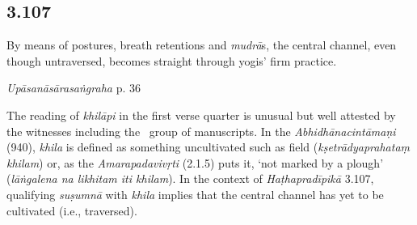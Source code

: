 \begin{ekdosis}


\subsection*{3.107}
\begin{translation}[hp03_107]
By means of postures, breath retentions and \emph{mudrā}s, the central channel, even though untraversed, becomes straight through yogis' firm practice.
\end{translation}
%


\begin{testimonia}[hp03_107]
\emph{Upāsanāsārasaṅgraha} p. 36 %
\begin{versinnote}
\end{versinnote}
\end{testimonia}

\begin{philcomm}[hp03_107]
The reading of \emph{khilāpi} in the first verse quarter is unusual but well attested by the witnesses including the \textalpha\ group of manuscripts. In the \emph{Abhidhāna\-cintāmaṇi} (940), \emph{khila} is defined as something uncultivated such as field (\emph{kṣetrādyaprahataṃ khilam}) or, as the \emph{Amarapadavivṛti} (2.1.5) puts it, `not marked by a plough' (\emph{lāṅgalena na likhitam iti khilam}). In the context of \emph{Haṭhapradīpikā} 3.107, qualifying \emph{suṣumnā} with \emph{khila} implies that the central channel has yet to be cultivated (i.e., traversed).



\end{philcomm}



\end{ekdosis}
